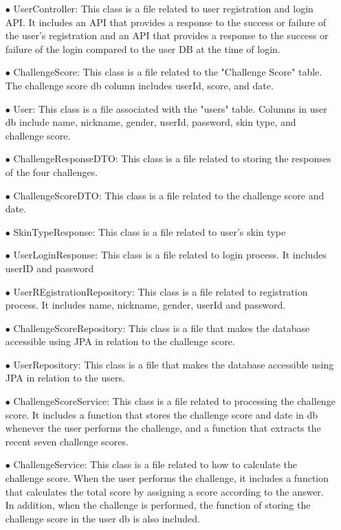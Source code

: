 \documentclass[conference]{IEEEtran}
\begin{document}
\begin{itemize}
\begin{itemize}
        \item[$\bullet$] UserController: This class is a file related to user registration and login API. It includes an API that provides a response to the success or failure of the user's registration and an API that provides a response to the success or failure of the login compared to the user DB at the time of login.
        \item[$\bullet$] ChallengeScore: This class is a file related to the "Challenge Score" table. The challenge score db column includes userId, score, and date.
        \item[$\bullet$] User: This class is a file associated with the "users" table. Columns in user db include name, nickname, gender, userId, password, skin type, and challenge score.
        \item[$\bullet$] ChallengeResponseDTO: This class is a file related to storing the responses of the four challenges.
        \item[$\bullet$] ChallengeScoreDTO: This class is a file related to the challenge score and date.
        \item[$\bullet$] SkinTypeResponse: This class is a file related to user's skin type
        \item[$\bullet$] UserLoginResponse: This class is a file related to login process. It includes userID and password
        \item[$\bullet$] UserREgistrationRepository: This class is a file related to registration process. It includes name, nickname, gender, userId and password.
        \item[$\bullet$] ChallengeScoreRepository: This class is a file that makes the database accessible using JPA in relation to the challenge score.
        \item[$\bullet$] UserRepository: This class is a file that makes the database accessible using JPA in relation to the users.
        \item[$\bullet$] ChallengeScoreService: This class is a file related to processing the challenge score. It includes a function that stores the challenge score and date in db whenever the user performs the challenge, and a function that extracts the recent seven challenge scores.
        \item[$\bullet$] ChallengeService: This class is a file related to how to calculate the challenge score. When the user performs the challenge, it includes a function that calculates the total score by assigning a score according to the answer. In addition, when the challenge is performed, the function of storing the challenge score in the user db is also included.

\end{itemize}
\end{itemize}
\end{document}

